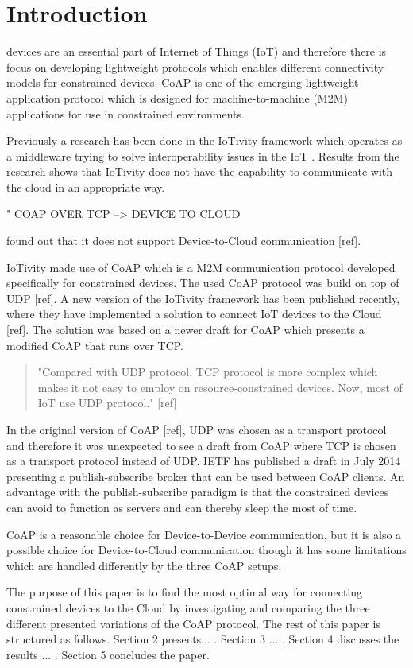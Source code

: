 \section{Introduction}
% 
% 
 devices are an essential part of Internet of Things (IoT) and therefore there is focus on developing lightweight protocols which enables different connectivity models for constrained devices.  
CoAP is one of the emerging lightweight application protocol which is designed for machine-to-machine (M2M) applications for use in constrained environments.   

Previously a research has been done in the IoTivity framework which operates as a middleware trying to solve interoperability issues in the IoT \cite{interoperabilityChallenge}. Results from the research shows that IoTivity does not have the capability to communicate with the cloud in an appropriate way. 

" COAP OVER TCP --> DEVICE TO CLOUD


found out that it does not support Device-to-Cloud communication [ref].

IoTivity made use of CoAP which is a M2M communication protocol developed specifically for constrained devices.
The used CoAP protocol was build on top of UDP [ref].
A new version of the IoTivity framework has been published recently, where they have implemented a solution to connect IoT devices to the Cloud [ref]. The solution was based on a newer draft for CoAP which presents a modified CoAP that runs over TCP.

\begin{quote}
	"Compared with UDP protocol, TCP protocol is more complex which makes it not easy to employ on resource-constrained devices. Now, most of IoT use UDP protocol." [ref]
\end{quote}
In the original version of CoAP [ref], UDP was chosen as a transport protocol and therefore it was unexpected to see a draft from CoAP where TCP is chosen as a transport protocol instead of UDP.
IETF has published a draft in July 2014 presenting a publish-subscribe broker that can be used between CoAP clients. An advantage with the publish-subscribe paradigm is that the constrained devices can avoid to function as servers and can thereby sleep the most of time.

CoAP is a reasonable choice for Device-to-Device communication,  but it is also a possible choice for Device-to-Cloud communication though it has some limitations which are handled differently by the three CoAP setups.

The purpose of this paper is to find the most optimal way for connecting constrained devices to the Cloud by investigating and comparing the three different presented variations of the CoAP protocol. The rest of this paper is structured as follows.  Section 2 presents... . Section 3 ... . Section 4 discusses the results ... . Section 5 concludes the paper.     
